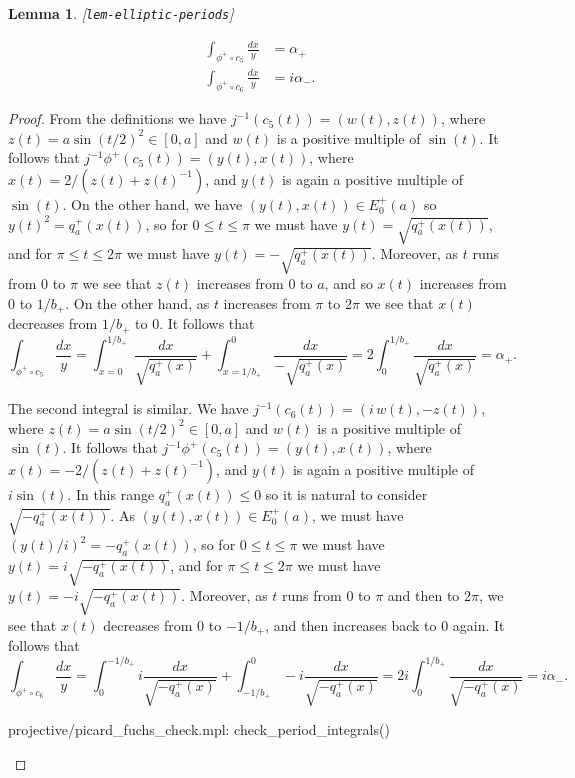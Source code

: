 \documentclass[reqno]{amsart}
\newcommand{\lbl}[1]{\label{#1}\textup{[\texttt{#1}]}\par}
\newcommand{\lbl}{\label}
\newcommand{\al}        {\alpha}
\renewcommand{\:}{\colon}
\newtheorem{lemma}[theorem]{Lemma}
\theoremstyle{definition}
\begin{document}
\begin{lemma}\lbl{lem-elliptic-periods}
 \begin{align*}
  \int_{\phi^+\circ c_5}\frac{dx}{y} &= \al_+ \\
  \int_{\phi^+\circ c_6}\frac{dx}{y} &= i\al_-.
 \end{align*}
\end{lemma}
\begin{proof}
 From the definitions we have $j^{-1}(c_5(t))=(w(t),z(t))$, where
 $z(t)=a\sin(t/2)^2\in [0,a]$ and $w(t)$ is a positive multiple of
 $\sin(t)$.  It follows that $j^{-1}\phi^+(c_5(t))=(y(t),x(t))$, where
 $x(t)=2/(z(t)+z(t)^{-1})$, and $y(t)$ is again a positive multiple of
 $\sin(t)$.  On the other hand, we have $(y(t),x(t))\in E^+_0(a)$ so
 $y(t)^2=q_a^+(x(t))$, so for $0\leq t\leq \pi$ we must have
 $y(t)=\sqrt{q^+_a(x(t))}$, and for $\pi\leq t\leq 2\pi$ we must have
 $y(t)=-\sqrt{q^+_a(x(t))}$.   Moreover, as $t$ runs from $0$ to $\pi$
 we see that $z(t)$ increases from $0$ to $a$, and so $x(t)$ increases
 from $0$ to $1/b_+$.  On the other hand, as $t$ increases from $\pi$
 to $2\pi$ we see that $x(t)$ decreases from $1/b_+$ to $0$.  It
 follows that
 \[ \int_{\phi^+\circ c_5}\frac{dx}{y} =
    \int_{x=0}^{1/b_+}\frac{dx}{\sqrt{q_a^+(x)}} +
    \int_{x=1/b_+}^{0}\frac{dx}{-\sqrt{q_a^+(x)}} =
    2\int_{0}^{1/b_+}\frac{dx}{\sqrt{q_a^+(x)}} =
    \al_+.
 \]

 The second integral is similar.  We have
 $j^{-1}(c_6(t))=(i\,w(t),-z(t))$, where $z(t)=a\sin(t/2)^2\in [0,a]$ and
 $w(t)$ is a positive multiple of $\sin(t)$.  It follows that
 $j^{-1}\phi^+(c_5(t))=(y(t),x(t))$, where $x(t)=-2/(z(t)+z(t)^{-1})$,
 and $y(t)$ is again a positive multiple of $i\sin(t)$.  In this range
 $q_a^+(x(t))\leq 0$ so it is natural to consider
 $\sqrt{-q_a^+(x(t))}$.  As $(y(t),x(t))\in E^+_0(a)$, we must have
 $(y(t)/i)^2=-q_a^+(x(t))$, so for $0\leq t\leq \pi$ we must have
 $y(t)=i\sqrt{-q^+_a(x(t))}$, and for $\pi\leq t\leq 2\pi$ we must
 have $y(t)=-i\sqrt{-q^+_a(x(t))}$.  Moreover, as $t$ runs from $0$ to
 $\pi$ and then to $2\pi$, we see that $x(t)$ decreases from $0$ to
 $-1/b_+$, and then increases back to $0$ again.  It follows that
 \[ \int_{\phi^+\circ c_6}\frac{dx}{y} =
    \int_{0}^{-1/b_+}i\frac{dx}{\sqrt{-q_a^+(x)}} +
    \int_{-1/b_+}^{0}-i\frac{dx}{\sqrt{-q_a^+(x)}} =
    2i\int_{0}^{1/b_+}\frac{dx}{\sqrt{-q_a^+(x)}} =
    i\al_-.
 \]
 \begin{checks}
  projective/picard_fuchs_check.mpl: check_period_integrals()
 \end{checks}
\end{proof}
\end{document}
